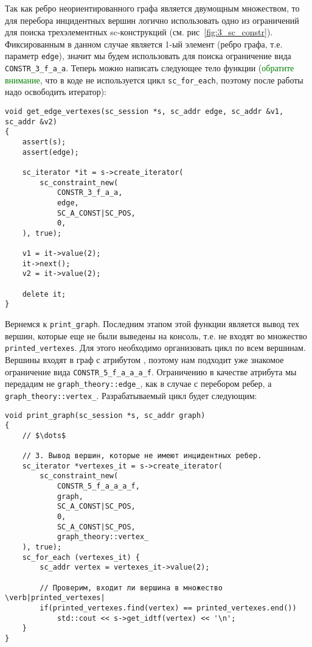 Так как ребро неориентированного графа является двумощным множеством,
то для перебора инцидентных вершин логично использовать одно из
ограничений для поиска трехэлементных sc-конструкций
(см. рис~\ref{fig:3_sc_constr}). Фиксированным в данном случае
является 1-ый элемент (ребро графа, т.е. параметр \lstinline|edge|),
значит мы будем использовать для поиска ограничение вида
\lstinline|CONSTR_3_f_a_a|. Теперь можно написать следующее тело
функции (\textcolor{green}{обратите внимание}, что в коде не
используется цикл \lstinline|sc_for_each|, поэтому после работы надо
освободить итератор):
\begin{lstlisting}[texcl]
void get_edge_vertexes(sc_session *s, sc_addr edge, sc_addr &v1, sc_addr &v2)
{
    assert(s);
    assert(edge);

    sc_iterator *it = s->create_iterator(
        sc_constraint_new(
            CONSTR_3_f_a_a,
            edge,
            SC_A_CONST|SC_POS,
            0,
    ), true);

    v1 = it->value(2);
    it->next();
    v2 = it->value(2);

    delete it;
}
\end{lstlisting}

Вернемся к \lstinline|print_graph|. Последним этапом этой функции
является вывод тех вершин, которые еще не были выведены на консоль,
т.е. не входят во множество \lstinline|printed_vertexes|. Для этого
необходимо организовать цикл по всем вершинам.  Вершины входят в граф
с атрибутом , поэтому нам подходит уже знакомое
ограничение вида \lstinline|CONSTR_5_f_a_a_a_f|. Ограничению в
качестве атрибута мы передадим не \lstinline|graph_theory::edge_|, как
в случае с перебором ребер, а
\lstinline|graph_theory::vertex_|. Разрабатываемый цикл будет
следующим:
\begin{lstlisting}[texcl]
void print_graph(sc_session *s, sc_addr graph)
{
    // $\dots$

    // 3. Вывод вершин, которые не имеют инцидентных ребер.
    sc_iterator *vertexes_it = s->create_iterator(
        sc_constraint_new(
            CONSTR_5_f_a_a_a_f,
            graph,
            SC_A_CONST|SC_POS,
            0,
            SC_A_CONST|SC_POS,
            graph_theory::vertex_
    ), true);
    sc_for_each (vertexes_it) {
        sc_addr vertex = vertexes_it->value(2);

        // Проверим, входит ли вершина в множество \verb|printed_vertexes|
        if(printed_vertexes.find(vertex) == printed_vertexes.end())
            std::cout << s->get_idtf(vertex) << '\n';
    }
}
\end{lstlisting}

